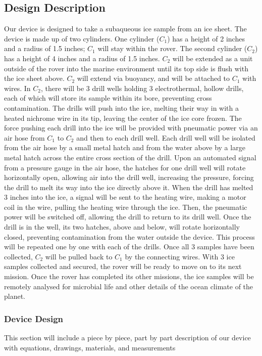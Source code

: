 \documentclass{article}
\begin{document}
\subsection{Design Description}
Our device is designed to take a subaqueous ice sample from an ice sheet. The device is made up of two cylinders. One cylinder ($C_1$) has a height of 2 inches and a radius of 1.5 inches; $C_1$ will stay within the rover. The second cylinder ($C_2$) has a height of 4 inches and a radius of 1.5 inches. $C_2$ will be extended as a unit outside of the rover into the marine environment until its top side is flush with the ice sheet above. $C_2$ will extend via buoyancy, and will be attached to $C_1$ with wires. In $C_2$, there will be 3 drill wells holding 3 electrothermal, hollow drills, each of which will store its sample within its bore, preventing cross contamination. The drills will push into the ice, melting their way in with a heated nichrome wire in its tip, leaving the center of the ice core frozen. The force pushing each drill into the ice will be provided with pneumatic power via an air hose from $C_1$ to $C_2$ and then to each drill well. Each drill well will be isolated from the air hose by a small metal hatch and from the water above by a large metal hatch across the entire cross section of the drill. Upon an automated signal from a pressure gauge in the air hose, the hatches for one drill well will rotate horizontally open, allowing air into the drill well, increasing the pressure, forcing the drill to melt its way into the ice directly above it. When the drill has melted 3 inches into the ice, a signal will be sent to the heating wire, making a motor coil in the wire, pulling the heating wire through the ice. Then, the pneumatic power will be switched off, allowing the drill to return to its drill well. Once the drill is in the well, its two hatches, above and below, will rotate horizontally closed, preventing contamination from the water outside the device. This process will be repeated one by one with each of the drills. Once all 3 samples have been collected, $C_2$ will be pulled back to $C_1$ by the connecting wires. With 3 ice samples collected and secured, the rover will be ready to move on to its next mission. Once the rover has completed its other missions, the ice samples will be remotely analysed for microbial life and other details of the ocean climate of the planet.

\subsubsection{Device Design}
This section will include a piece by piece, part by part description of our device with equations, drawings, materials, and measurements
\end{document}
